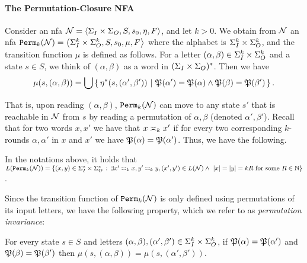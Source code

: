 \paragraph{The Permutation-Closure \bf NFA}
Consider an \gls{nfa} $\cN=\tup{\sI\times\sO,S,s_0,\eta,F}$, and let $k>0$. 
We obtain from $\cN$ an \gls{nfa} $\perm_k(\cN)=\tup{\sI^k \times \sO^k,S, s_0, \mu, F}$
where the alphabet is $\sI^k\times \sO^k$, and the transition function $\mu$ is defined as follows. For a letter $(\alpha,\beta)\in \sI^k \times \sO^k$ and a state $s\in S$, we think of $(\alpha,\beta)$ as a word in $(\sI\times \sO)^*$. Then we have
\begin{equation}
\label{test}
    \mu(s,(\alpha,\beta))=\bigcup\condset{\eta^*(s,(\alpha',\beta'))}{\fP(\alpha')=\fP(\alpha) \wedge \fP(\beta)=\fP(\beta')}.
\end{equation}

That is, upon reading $(\alpha,\beta)$, $\perm_k(\cN)$ can move to any state $s'$ that is reachable in $\cN$ from $s$
by reading a permutation of $\alpha,\beta$ (denoted $\alpha',\beta'$).
Recall that for two words $x,x'$ we have that $x\req[k]x'$ if for every two corresponding $k$-rounds $\alpha,\alpha'$ in $x$ and $x'$ we have $\fP(\alpha)=\fP(\alpha')$. 
Thus, we have the following.
\begin{observation}
	\label{obs:perm_closure_language}
	In the notations above, it holds that $L(\perm_k(\cN))=\{(x,y)\in \sI^*\times \sO^* \ST \exists x'\req[k] x, y'\req[k] y, (x',y')\in L(\cN) \wedge\ |x|=|y|=kR \text{ for some }R\in \bbN\}$.
	\end{observation}
Since the transition function of $\perm_k(\cN)$ is only defined using permutations of its input letters, we have the following property, which we refer to as \emph{permutation invariance}:
\begin{observation}
	\label{obs:perm_invariance}
	For every state $s\in S$ and letters $(\alpha,\beta), (\alpha',\beta')\in \sI^k \times \sO^k$, if $\fP(\alpha)=\fP(\alpha')$ and $\fP(\beta)=\fP(\beta')$ then $\mu(s,(\alpha,\beta))=\mu(s,(\alpha',\beta'))$.
\end{observation}

